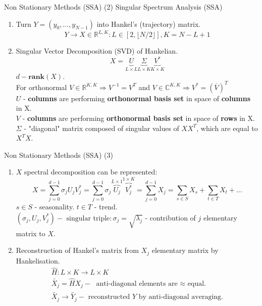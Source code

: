 \documentclass[aspectratio= 169]{beamer}
\newcommand{\R}{\mathbb{R}}
\begin{document}
			\begin{frame}{Non Stationary Methods (SSA) (2)}
					Singular Spectrum Analysis (SSA)
					\begin{enumerate}
						\item Turn ${Y = (y_0, ..., y_{N - 1})}$ into Hankel's (trajectory) matrix.
						\begin{equation}
							Y \rightarrow X \in \R^{L, K}: L \in [2, \lfloor N / 2 \rfloor], K = N - L + 1
						\end{equation}
						\item Singular Vector Decomposition (SVD) of Hankelian.
						\begin{equation}
							X = \underbrace{U}_{L \times L} \underbrace{\Sigma}_{L \times K} \underbrace{V^*}_{K \times K}
						\end{equation}
						${d - \textbf{rank}(X)}$.\\
						For orthonormal $V \in \R^{K,K} \Rightarrow V^{-1} = V^T$ and ${V \in \mathbb{C}^{K, K} \Rightarrow V^* = \left(\overline{V}\right)^T}$\\
						${U}$ - \textbf{columns} are performing \textbf{orthonormal basis set} in space of \textbf{columns} in X.\\
						${V}$ - \textbf{columns} are performing \textbf{orthonormal basis set} in space of \textbf{rows} in X.\\
						${\Sigma}$ - "diagonal" matrix composed of singular values of ${XX^T}$, which are equal to ${X^TX}$.
					\end{enumerate}
			\end{frame}
		
			\begin{frame}{Non Stationary Methods (SSA) (3)}
				\begin{enumerate}
					\item $X$ spectral decomposition can be represented:
					\begin{equation}
						X = \sum_{j = 0}^{d - 1} \sigma_j U_j V_j^* = \sum_{j = 0}^{d - 1} \sigma_j \overbrace{U_j}^{L \times 1} \overbrace{V_j^*}^{1 \times K} = \sum_{j = 0}^{d - 1} X_j = \sum_{s \in S} X_s + \sum_{t \in T} X_t + \ldots
					\end{equation}
					$s \in S$ - seasonality. $t \in T$ - trend.\\
					${(\sigma_j, U_j, V_j^*) - \text{ singular triple}: \sigma_j = \sqrt{\lambda_j}}$ - contribution of $j$ elementary matrix to $X$.
					
					\item Reconstruction of Hankel's matrix from $X_j$ elementary matrix by Hankelisation.
					\begin{equation}
						\begin{array}{l}
							\hat{H}: L\times K \rightarrow L \times K\\
							\tilde{X_j} = \hat{H}X_j - \text{ anti-diagonal elements are $\approx$ equal.}\\
							\tilde{X_j} \rightarrow \tilde{Y_j} - \text{ reconstructed $Y$ by anti-diagonal averaging.}
						\end{array}
					\end{equation}
				\end{enumerate}
			\end{frame}
		
\end{document}
